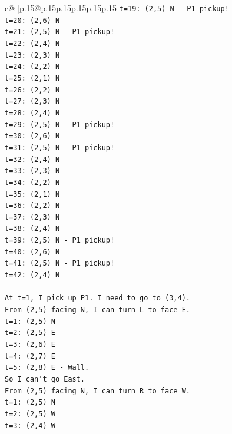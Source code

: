 \documentclass{article}
\begin{document}
{\begin{supertabular}{c@{$\;$}|p{.15\linewidth}@{}p{.15\linewidth}p{.15\linewidth}p{.15\linewidth}p{.15\linewidth}p{.15\linewidth}}
{{{\texttt{t=19: (2,5) N {-} P1 pickup!} \\
\texttt{t=20: (2,6) N} \\
\texttt{t=21: (2,5) N {-} P1 pickup!} \\
\texttt{t=22: (2,4) N} \\
\texttt{t=23: (2,3) N} \\
\texttt{t=24: (2,2) N} \\
\texttt{t=25: (2,1) N} \\
\texttt{t=26: (2,2) N} \\
\texttt{t=27: (2,3) N} \\
\texttt{t=28: (2,4) N} \\
\texttt{t=29: (2,5) N {-} P1 pickup!} \\
\texttt{t=30: (2,6) N} \\
\texttt{t=31: (2,5) N {-} P1 pickup!} \\
\texttt{t=32: (2,4) N} \\
\texttt{t=33: (2,3) N} \\
\texttt{t=34: (2,2) N} \\
\texttt{t=35: (2,1) N} \\
\texttt{t=36: (2,2) N} \\
\texttt{t=37: (2,3) N} \\
\texttt{t=38: (2,4) N} \\
\texttt{t=39: (2,5) N {-} P1 pickup!} \\
\texttt{t=40: (2,6) N} \\
\texttt{t=41: (2,5) N {-} P1 pickup!} \\
\texttt{t=42: (2,4) N} \\
\\ 
\texttt{At t=1, I pick up P1. I need to go to (3,4).} \\
\texttt{From (2,5) facing N, I can turn L to face E.} \\
\texttt{t=1: (2,5) N} \\
\texttt{t=2: (2,5) E} \\
\texttt{t=3: (2,6) E} \\
\texttt{t=4: (2,7) E} \\
\texttt{t=5: (2,8) E {-} Wall.} \\
\texttt{So I can't go East.} \\
\texttt{From (2,5) facing N, I can turn R to face W.} \\
\texttt{t=1: (2,5) N} \\
\texttt{t=2: (2,5) W} \\
\texttt{t=3: (2,4) W} \\
}}}
\end{supertabular}}
\end{document}
